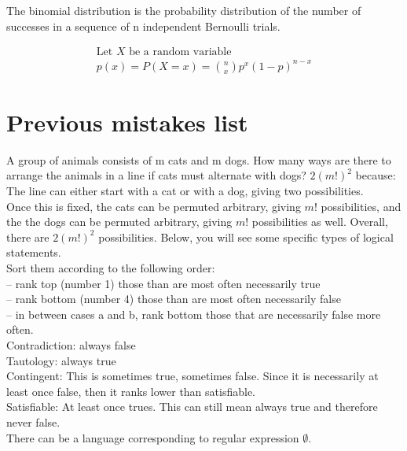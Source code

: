 \documentclass{article}
\begin{document}
The binomial distribution is the probability distribution of the number of successes in a sequence of n independent Bernoulli trials.

\begin{align*}
    \text{Let } X \text{ be a random variable} \\
    p(x) = P(X = x) = \binom{n}{x} p^x (1 - p)^{n - x}
\end{align*}

\section{Previous mistakes list}

\begin{outline}
    \1 A group of animals consists of m cats and m dogs. How many ways are there to arrange the animals in a line if cats must alternate with dogs?
    \2 $2(m!)^2$ because: The line can either start with a cat or with a dog, giving two possibilities. \\
    Once this is fixed, the cats can be permuted arbitrary, giving $ m! $ possibilities, and the the dogs can be permuted arbitrary, giving $ m! $ possibilities as well. Overall, there are $2(m!)^2$ possibilities.
    \1 Below, you will see some specific types of logical statements. \\
    Sort them according to the following order: \\
    -- rank top (number 1) those than are most often necessarily true \\
    -- rank bottom (number 4) those than are most often necessarily false \\
    -- in between cases a and b, rank bottom those that are necessarily false more often.\\
    \2 Contradiction: always false \\
    Tautology: always true \\
    Contingent: This is sometimes true, sometimes false. Since it is necessarily at least once false, then it ranks lower than satisfiable. \\
    Satisfiable: At least once trues. This can still mean always true and therefore never false. \\
    \1 There can be a language corresponding to regular expression $ \emptyset $.
\end{outline}
\end{document}
